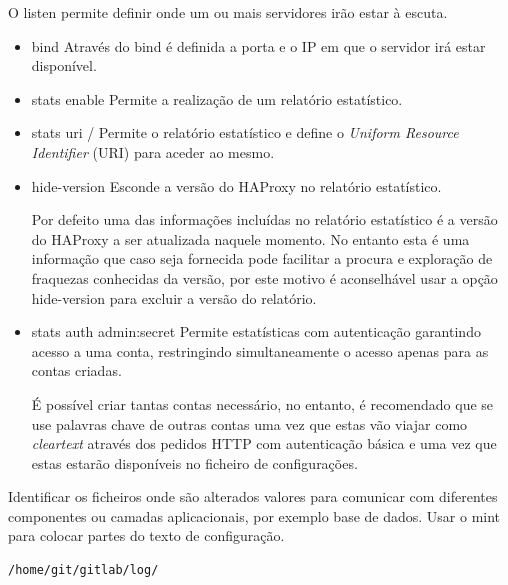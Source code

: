 \documentclass[12pt,a4paper]{article}
\begin{document}
O listen permite definir onde um ou mais servidores irão estar à escuta.

\begin{itemize}
    \item bind
Através do bind é definida a porta e o IP em que o servidor irá estar disponível.

    \item stats enable
Permite a realização de um relatório estatístico.

    \item stats uri /
Permite o relatório estatístico e define o \emph{Uniform Resource Identifier} (URI) para aceder ao mesmo.    

    \item hide-version
Esconde a versão do HAProxy no relatório estatístico.

Por defeito uma das informações incluídas no relatório estatístico é a versão do HAProxy a ser atualizada naquele momento. No entanto esta é uma informação que caso seja fornecida pode facilitar a procura e exploração de fraquezas conhecidas da versão, por este motivo é aconselhável usar a opção hide-version para excluir a versão do relatório.

    \item stats auth admin:secret
Permite estatísticas com autenticação garantindo acesso a uma conta, restringindo simultaneamente o acesso apenas para as contas criadas.

É possível criar tantas contas necessário, no entanto, é recomendado que se use palavras chave de outras contas uma vez que estas vão viajar como \emph{cleartext} através dos pedidos HTTP com autenticação básica e uma vez que estas estarão disponíveis no ficheiro de configurações. 

\end{itemize}














Identificar os ficheiros onde são alterados valores para comunicar com diferentes componentes ou camadas aplicacionais, por exemplo base de dados.
Usar o mint para colocar partes do texto de configuração.

\begin{verbatim}
/home/git/gitlab/log/
\end{verbatim}
\fi
\end{document}
